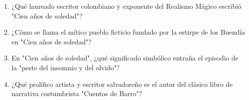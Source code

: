 \documentclass[10pt,a4paper]{article}
\begin{document}
\begin{enumerate}[label=\textbf{\arabic*.}]
\item ¿Qué laureado escritor colombiano y exponente del Realismo Mágico escribió "Cien años de soledad"?
\begin{enumerate}[label=\textbf{\Alph*)}]
\end{enumerate}
\vspace{0.15cm}
\item ¿Cómo se llama el mítico pueblo ficticio fundado por la estirpe de los Buendía en "Cien años de soledad"?
\begin{enumerate}[label=\textbf{\Alph*)}]
\end{enumerate}
\vspace{0.15cm}
\item En "Cien años de soledad", ¿qué significado simbólico entraña el episodio de la "peste del insomnio y del olvido"?
\begin{enumerate}[label=\textbf{\Alph*)}]
\end{enumerate}
\vspace{0.15cm}
\item ¿Qué prolífico artista y escritor salvadoreño es el autor del clásico libro de narrativa costumbrista "Cuentos de Barro"?
\begin{enumerate}[label=\textbf{\Alph*)}]
\end{enumerate}
\end{enumerate}
\end{document}
